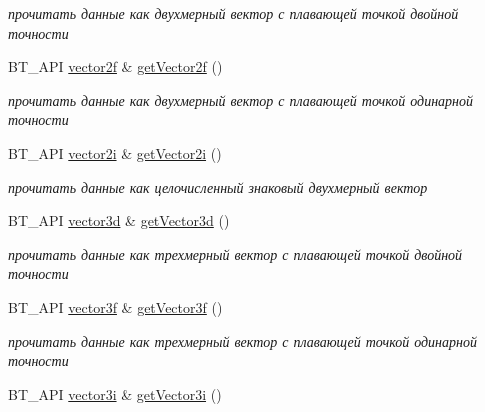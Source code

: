 \begin{DoxyCompactItemize}
\begin{DoxyCompactList}\small\item\em прочитать данные как двухмерный вектор с плавающей точкой двойной точности \end{DoxyCompactList}\item 
\hypertarget{classbt_1_1_variant_a3ec896103cd3591dad12c34005fdfa3c}{B\-T\-\_\-\-A\-P\-I \hyperlink{classbt_1_1vector2f}{vector2f} \& \hyperlink{classbt_1_1_variant_a3ec896103cd3591dad12c34005fdfa3c}{get\-Vector2f} ()}\label{classbt_1_1_variant_a3ec896103cd3591dad12c34005fdfa3c}

\begin{DoxyCompactList}\small\item\em прочитать данные как двухмерный вектор с плавающей точкой одинарной точности \end{DoxyCompactList}\item 
\hypertarget{classbt_1_1_variant_a6efa70c1a8b657b4fb943f6eb0076773}{B\-T\-\_\-\-A\-P\-I \hyperlink{classbt_1_1vector2i}{vector2i} \& \hyperlink{classbt_1_1_variant_a6efa70c1a8b657b4fb943f6eb0076773}{get\-Vector2i} ()}\label{classbt_1_1_variant_a6efa70c1a8b657b4fb943f6eb0076773}

\begin{DoxyCompactList}\small\item\em прочитать данные как целочисленный знаковый двухмерный вектор \end{DoxyCompactList}\item 
\hypertarget{classbt_1_1_variant_a8cba2edc796a2ac688b3593907f7f710}{B\-T\-\_\-\-A\-P\-I \hyperlink{classbt_1_1vector3d}{vector3d} \& \hyperlink{classbt_1_1_variant_a8cba2edc796a2ac688b3593907f7f710}{get\-Vector3d} ()}\label{classbt_1_1_variant_a8cba2edc796a2ac688b3593907f7f710}

\begin{DoxyCompactList}\small\item\em прочитать данные как трехмерный вектор с плавающей точкой двойной точности \end{DoxyCompactList}\item 
\hypertarget{classbt_1_1_variant_a9a03aac2011cae910be1f4dc0bcc8ed4}{B\-T\-\_\-\-A\-P\-I \hyperlink{classbt_1_1vector3f}{vector3f} \& \hyperlink{classbt_1_1_variant_a9a03aac2011cae910be1f4dc0bcc8ed4}{get\-Vector3f} ()}\label{classbt_1_1_variant_a9a03aac2011cae910be1f4dc0bcc8ed4}

\begin{DoxyCompactList}\small\item\em прочитать данные как трехмерный вектор с плавающей точкой одинарной точности \end{DoxyCompactList}\item 
\hypertarget{classbt_1_1_variant_a5a78399bf6f5da7a29805e5c841174ac}{B\-T\-\_\-\-A\-P\-I \hyperlink{classbt_1_1vector3i}{vector3i} \& \hyperlink{classbt_1_1_variant_a5a78399bf6f5da7a29805e5c841174ac}{get\-Vector3i} ()}\label{classbt_1_1_variant_a5a78399bf6f5da7a29805e5c841174ac}


\end{DoxyCompactItemize}
